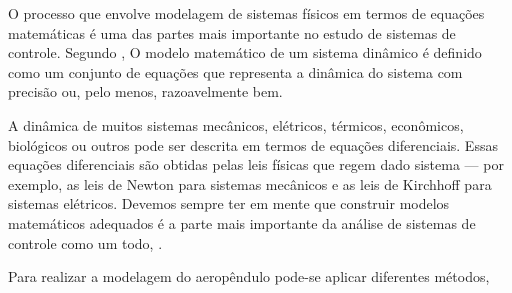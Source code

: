 O processo que envolve modelagem de sistemas físicos em termos de equações matemáticas é uma das partes mais importante no estudo de sistemas de controle. Segundo , O modelo matemático de um sistema dinâmico é definido como um conjunto de equações que representa a dinâmica do sistema com precisão ou, pelo menos, razoavelmente bem.

\begin{citacao}
	A dinâmica de muitos sistemas mecânicos, elétricos, térmicos, econômicos, biológicos ou
	outros pode ser descrita em termos de equações diferenciais. Essas equações diferenciais são	obtidas pelas leis físicas que regem dado sistema — por exemplo, as leis de Newton para sistemas mecânicos e as leis de Kirchhoff para sistemas elétricos. Devemos sempre ter em mente que construir modelos matemáticos adequados é a parte mais importante da análise de sistemas de controle como um todo, .
\end{citacao}

Para realizar a modelagem do aeropêndulo pode-se aplicar diferentes métodos, 